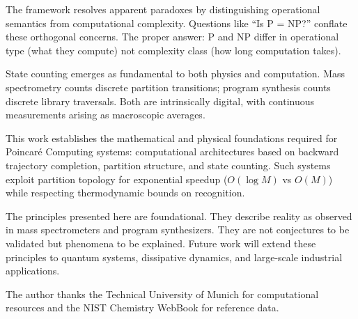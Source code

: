 \documentclass[twocolumn,aps,prl,superscriptaddress,floatfix]{revtex4-2}
\begin{document}
The framework resolves apparent paradoxes by distinguishing operational semantics from computational complexity. Questions like ``Is P = NP?'' conflate these orthogonal concerns. The proper answer: P and NP differ in operational type (what they compute) not complexity class (how long computation takes).

State counting emerges as fundamental to both physics and computation. Mass spectrometry counts discrete partition transitions; program synthesis counts discrete library traversals. Both are intrinsically digital, with continuous measurements arising as macroscopic averages.

This work establishes the mathematical and physical foundations required for Poincar\'e Computing systems: computational architectures based on backward trajectory completion, partition structure, and state counting. Such systems exploit partition topology for exponential speedup ($O(\log M)$ vs $O(M)$) while respecting thermodynamic bounds on recognition.

The principles presented here are foundational. They describe reality as observed in mass spectrometers and program synthesizers. They are not conjectures to be validated but phenomena to be explained. Future work will extend these principles to quantum systems, dissipative dynamics, and large-scale industrial applications.

\begin{acknowledgments}
The author thanks the Technical University of Munich for computational resources and the NIST Chemistry WebBook for reference data.
\end{acknowledgments}



\end{document}
